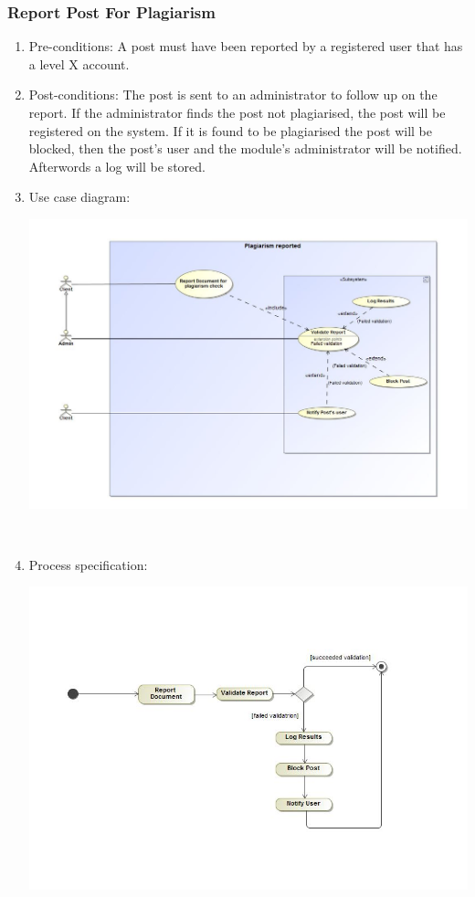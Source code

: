 \documentclass[hidelinks, 12pt, oneside]{article}
\begin{document}
\subsubsection{Report Post For Plagiarism}
\begin{enumerate}
 \item Pre-conditions: A post must have been reported by a registered user that has a level X account. 
 
 \item Post-conditions: The post is sent to an administrator to follow up on the report. If the administrator finds the post not plagiarised, the post will be registered on the system. If it is found to be plagiarised the post will be blocked, then the post's user and the module's administrator will be notified. Afterwords a log will be stored. 

  \item Use case diagram:\\
  \centerline{\includegraphics[scale=0.4]{plagiarismReportUC}}\\
   \item Process specification:\\
 \centerline{\includegraphics[scale=0.35]{plagiarismReportAD}} 
\end{enumerate}
\end{document}
